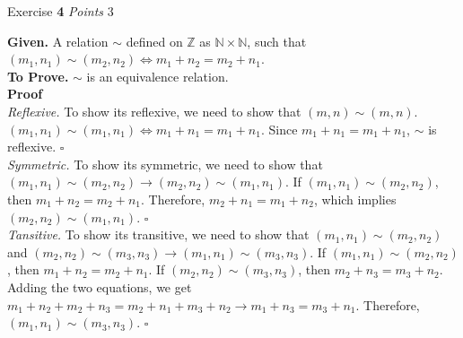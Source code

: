 \documentclass[11pt]{article}
\newcommand{\problem
}[2]{
\begin{mdframed}
    Exercise \textbf{#1} \hfill \emph{Points }#2
\end{mdframed}
}
\begin{document}
%







\problem{4}{3}
\textbf{Given. } A relation $\sim$ defined on $\mathbb{Z}$ as $\mathbb{N} \times \mathbb{N}$, such that $(m_1, n_1) \sim (m_2, n_2) \iff m_1 + n_2 = m_2 + n_1$.\\
\textbf{To Prove. } $\sim$ is an equivalence relation.\\
\textbf{Proof }\\
\emph{Reflexive.} To show its reflexive, we need to show that $(m, n) \sim (m, n)$. $(m_1, n_1) \sim (m_1, n_1) \iff m_1 + n_1 = m_1 + n_1$. Since $m_1 + n_1 = m_1 + n_1$, $\sim$ is reflexive. \hfill $\square$
\medskip \\
\emph{Symmetric.} To show its symmetric, we need to show that $(m_1, n_1) \sim (m_2, n_2) \rightarrow (m_2, n_2) \sim (m_1, n_1)$. If $(m_1, n_1) \sim (m_2, n_2)$, then $m_1 + n_2 = m_2 + n_1$. Therefore, $m_2 + n_1 = m_1 + n_2$, which implies $(m_2, n_2) \sim (m_1, n_1)$. \hfill $\square$
\medskip \\
\emph{Tansitive.} To show its transitive, we need to show that $(m_1, n_1) \sim (m_2, n_2)$ and $(m_2, n_2) \sim (m_3, n_3) \rightarrow (m_1, n_1) \sim (m_3, n_3)$. If $(m_1, n_1) \sim (m_2, n_2)$, then $m_1 + n_2 = m_2 + n_1$. If $(m_2, n_2) \sim (m_3, n_3)$, then $m_2 + n_3 = m_3 + n_2$. Adding the two equations, we get $m_1 + n_2 + m_2 + n_3 = m_2 + n_1 + m_3 + n_2 \rightarrow m_1 + n_3 = m_3 + n_1$. Therefore, $(m_1, n_1) \sim (m_3, n_3)$. \hfill $\square$\\
\end{document}
